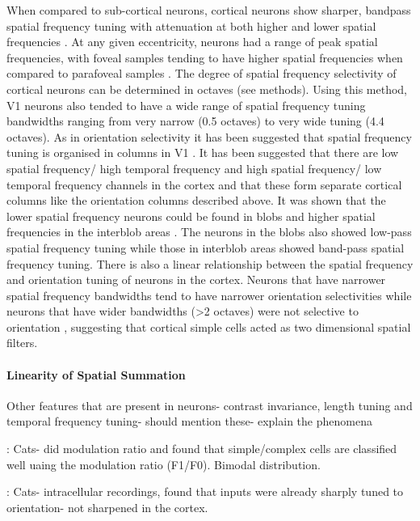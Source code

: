 When compared to sub-cortical neurons, cortical neurons show sharper, bandpass spatial frequency tuning with attenuation at both higher and lower spatial frequencies \cite{Maffei1973a, Campbell1969a, Schiller1976a, DeValois1982a, DeValois1990a}. At any given eccentricity, neurons had a range of peak spatial frequencies, with foveal samples tending to have higher spatial frequencies when compared to parafoveal samples \cite{DeValois1982a}. The degree of spatial frequency selectivity of cortical neurons can be determined in octaves (see methods). Using this method, V1 neurons also tended to have a wide range of spatial frequency tuning bandwidths ranging from very narrow (0.5 octaves) to very wide tuning (4.4 octaves). As in orientation selectivity it has been suggested that spatial frequency tuning is organised in columns in V1 \cite{Tootell1981}. It has been suggested that there are low spatial frequency/ high temporal frequency and high spatial frequency/ low temporal frequency channels in the cortex and that these form separate cortical columns like the orientation columns described above. It was shown that the lower spatial frequency neurons could be found in blobs and higher spatial frequencies in the interblob areas \cite{Silverman1989, Born1991}. The neurons in the blobs also showed low-pass spatial frequency tuning while those in interblob areas showed band-pass spatial frequency tuning. There is also a linear relationship between the spatial frequency and orientation tuning of neurons in the cortex. Neurons that have narrower spatial frequency bandwidths tend to have narrower orientation selectivities while neurons that have wider bandwidths (>2 octaves) were not selective to orientation \cite{DeValois1982a, Movshon1978.}, suggesting that cortical simple cells acted as two dimensional spatial filters.

\paragraph{Linearity of Spatial Summation}

Other features that are present in neurons- contrast invariance, length tuning and temporal frequency tuning- should mention these- explain the phenomena

\cite{Skottun1991}: Cats- did modulation ratio and found that simple/complex cells are classified well uaing the modulation ratio (F1/F0). Bimodal distribution.

\cite{Ferster1986}: Cats- intracellular recordings, found that inputs were already sharply tuned to orientation- not sharpened in the cortex. 

